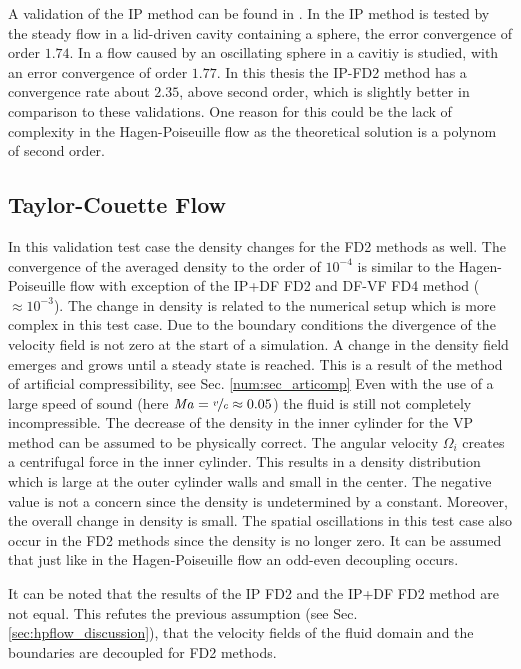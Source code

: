 A validation of the IP method can be found in \citep{Gilmanov2003, Gilmanov2005}.
In \citep{Gilmanov2003} the IP method is tested by the steady flow in a lid-driven cavity containing a sphere, the error convergence of order $1.74$.
In  \citep{Gilmanov2005} a flow caused by an oscillating sphere in a cavitiy is studied, with an error convergence of order $1.77$.
In this thesis the IP-FD2 method has a convergence rate about $2.35$, above second order, which is slightly better in comparison to these validations.
One reason for this could be the lack of complexity in the Hagen-Poiseuille flow as the theoretical solution is a polynom of second order.

\subsection{Taylor-Couette Flow}

In this validation test case the density changes for the FD2 methods as well.
The convergence of the averaged density to the order of $10^{-4}$
is similar to the Hagen-Poiseuille flow with exception of the IP+DF FD2 and DF-VF FD4 method ($\approx10^{-3}$).
The change in density is related to the numerical setup which is more complex in this test case.
Due to the boundary conditions the divergence of the velocity field is not zero at the start of a simulation.
A change in the density field emerges and grows until a steady state is reached.
This is a result of the method of artificial compressibility, see Sec. \ref{num:sec_articomp}
Even with the use of a large speed of sound (here $\operatorname{\mathit{M\kern-.10em a}}=\nicefrac{v}{c}\approx0.05$)
the fluid is still not completely incompressible.
The decrease of the density in the inner cylinder for the VP method can be assumed to be physically correct.
The angular velocity $\Omega_i$ creates a centrifugal force in the inner cylinder.
This results in a density distribution which is large at the outer cylinder walls and small in the center.
The negative value is not a concern since the density is undetermined by a constant.
Moreover, the overall change in density is small.
The spatial oscillations in this test case also occur in the FD2 methods since the density is no longer zero.
It can be assumed that just like in the Hagen-Poiseuille flow an odd-even decoupling occurs.

It can be noted that the results of the IP FD2 and the IP+DF FD2 method are not equal.
This refutes the previous assumption (see Sec. \ref{sec:hpflow_discussion}),
that the velocity fields of the fluid domain and the boundaries are decoupled for FD2 methods.

